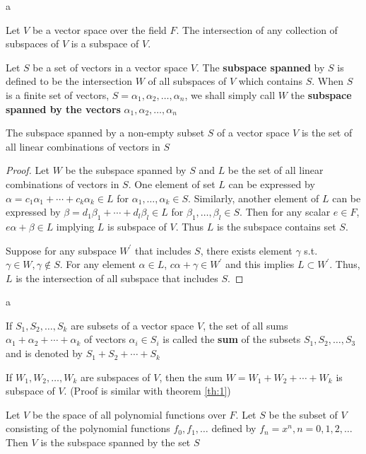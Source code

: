 \documentclass[8pt]{beamer}
\newcommand{\tb}[1]{\textbf{#1}}
\begin{document}
\begin{frame}{a}
    \begin{theorem}
        Let $V$ be a vector space over the field $F$. The intersection of any collection of subspaces of $V$ is a subspace of $V$.
    \end{theorem}
    \begin{definition}
        Let $S$ be a set of vectors in a vector space $V$. The \tb{subspace spanned} by $S$ is defined to be the intersection $W$ of all subspaces of $V$ which contains $S$. When $S$ is a finite set of vectors, $S = {\alpha_1, \alpha_2, \dots, \alpha_n}$, we shall simply call $W$ the \tb{subspace spanned by the vectors} $\alpha_1, \alpha_2, \dots, \alpha_n$
    \end{definition}

    \begin{theorem}\label{th:1}
        The subspace spanned by a non-empty subset $S$ of a vector space $V$ is the set of all linear combinations of vectors in $S$
    \end{theorem}
    \begin{proof}
        Let $W$ be the subspace spanned by $S$ and $L$ be the set of all linear combinations of vectors in $S$. One element of set $L$ can be expressed by $\alpha = c_1 \alpha_1 + \cdots + c_k \alpha_k \in L$ for $\alpha_1, \dots, \alpha_k \in S$. Similarly, another element of $L$ can be expressed by $\beta= d_1 \beta_1 + \cdots + d_l \beta_l \in L$ for $\beta_1 , \dots, \beta_l \in S$. Then for any scalar $e \in F$, $e\alpha + \beta \in L$ implying $L$ is subspace of $V$.
        Thus $L$ is the subspace contains set $S$. 
        
        Suppose for any subspace $W^\prime$ that includes $S$, there exists element $\gamma$ s.t. $\gamma \in W, \gamma \notin S$.
        For any element $\alpha \in L$, $c\alpha + \gamma \in W^\prime$ and this implies $L \subset W^\prime$. Thus, $L$ is the intersection of all subspace that includes $S$.
    \end{proof}
\end{frame}

\begin{frame}{a}
    \begin{definition}
        If $S_1, S_2, \dots, S_k$ are subsets of a vector space $V$, the set of all sums $\alpha_1 + \alpha_2 + \cdots +\alpha_k$ of vectors $\alpha_i \in S_i$ is called the \tb{sum} of the subsets $S_1, S_2, \dots, S_3$ and is denoted by $S_1 + S_2 + \cdots + S_k$
    \end{definition}

    If $W_1, W_2, \dots, W_k$ are subspaces of $V$, then the sum $W = W_1 + W_2 + \cdots + W_k$ is subspace of $V$. (Proof is similar with theorem \ref{th:1})

    \begin{example} \label{ex:1}
        Let $V$ be the space of all polynomial functions over $F$. Let $S$ be the subset of $V$ consisting of the polynomial functions $f_0, f_1, \dots$ defined by $f_n = x^n, n=0, 1, 2, \dots$
        Then $V$ is the subspace spanned by the set $S$
    \end{example}
\end{frame}
\end{document}
